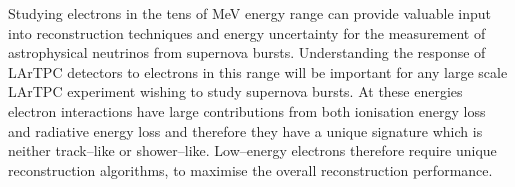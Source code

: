 % 
% 
% 

\minitoc

\noindent
Studying electrons in the tens of MeV energy range can provide valuable input 
into reconstruction techniques and energy uncertainty for the measurement of
astrophysical neutrinos from supernova bursts. Understanding the response of
LArTPC detectors to electrons in this range will be important for any large
scale LArTPC experiment wishing to study supernova bursts. At these energies
electron interactions have large contributions from both ionisation energy loss
and radiative energy loss and therefore they have a unique signature which is 
neither track--like or shower--like. Low--energy electrons therefore require 
unique reconstruction algorithms, to maximise the overall reconstruction 
performance. 

